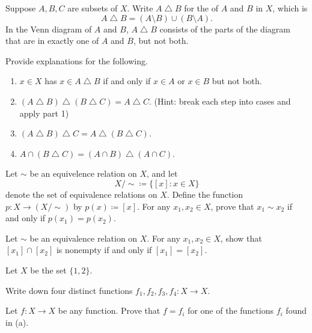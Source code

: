 \documentclass[../notes.tex]{subfiles}
\begin{document}
\begin{homework}
    Suppose $A, B, C$ are subsets of $X$. Write $A \operatorname{\triangle} B$ for the  of $A$ and $B$ in $X$, which is
    $$A \operatorname{\triangle} B = (A \setminus B) \cup (B \setminus A).$$
    In the Venn diagram of $A$ and $B$, $A \operatorname{\triangle} B$ consists of the parts of the diagram that are in exactly one of $A$ and $B$, but not both.
    
    Provide explanations for the following.
    \begin{enumerate}[label=(\alph*)]
        \item $x \in X$ has $x \in A \operatorname{\triangle} B$ if and only if $x \in A$ or $x \in B$ but not both.
        \item $(A \operatorname{\triangle} B) \operatorname{\triangle} {(B \operatorname{\triangle} C)} = A \operatorname{\triangle} C$. (Hint: break each step into cases and apply part 1)
        \item $(A \operatorname{\triangle} B)\operatorname{\triangle}C=A\operatorname{\triangle}{}(B\operatorname{\triangle}C)$.
        \item $A\cap(B\operatorname{\triangle}C)=(A\cap B)\operatorname{\triangle}{}(A\cap C)$.
    \end{enumerate}
\end{homework}

\begin{homework}
    Let $\sim$ be an equivelence relation on $X$, and let
    \[X/{\sim}\coloneqq\{[x]:x\in X\}\]
    denote the set of equivalence relations on $X$. Define the function $p\colon X\to(X/{\sim})$ by $p(x)\coloneqq[x]$. For any $x_1,x_2\in X$, prove that $x_1\sim x_2$ if and only if $p(x_1)=p(x_2)$.
\end{homework}

\begin{homework}
    Let $\sim$ be an equivalence relation on $X$. For any $x_1,x_2\in X$, show that $[x_1]\cap[x_2]$ is nonempty if and only if $[x_1]=[x_2]$.
\end{homework}

\begin{homework}
    Let $X$ be the set $\{1,2\}$.
    \begin{listalph}
        \item Write down four distinct functions $f_1,f_2,f_3,f_4\colon X\to X$.
        \item Let $f\colon X\to X$ be any function. Prove that $f=f_i$ for one of the functions $f_i$ found in (a).
    \end{listalph}
\end{homework}
\end{document}
